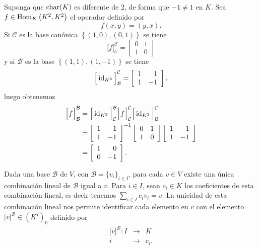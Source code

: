 \begin{ejem}
Suponga que $\operatorname{char}(K)$ es diferente de $2$, de forma que $-1\ne 1$ en $K$. Sea $f\in\operatorname{Hom}_K\left(K^2,K^2\right)$ el operador definido por
$$f(x,y)=(y,x).$$
Si $\mathcal{C}$ es la base  can\'onica $\left\{(1,0),(0,1)\right\}$ se tiene
$$\Big[ f\Big]^{\mathcal{C}}_{\mathcal{C}}=
\left[\begin{array}{rr}
0 & 1\\ 1 & 0
\end{array}\right]
$$
y si $\mathcal{B}$ es la base $\left\{(1,1),(1,-1)\right\}$ se tiene
$$\Big[ \operatorname{id}_{K^2}\Big]^{\mathcal{C}}_{\mathcal{B}}=
\left[\begin{array}{rr}
1 & 1\\ 1 & -1
\end{array}\right],
$$
luego obtenemos
\begin{align*}
\Big[ f\Big]^{\mathcal{B}}_{\mathcal{B}} &= \Big[ \operatorname{id}_{K^2}\Big]^{\mathcal{B}}_{\mathcal{C}}\Big[ f\Big]^{\mathcal{C}}_{\mathcal{C}}\Big[ \operatorname{id}_{K^2}\Big]^{\mathcal{C}}_{\mathcal{B}}\\
 &=\left[\begin{array}{rr}
1 & 1\\ 1 & -1
\end{array}\right]^{-1}
\left[\begin{array}{rr}
0 & 1\\ 1 & 0
\end{array}\right]
\left[\begin{array}{rr}
1 & 1\\ 1 & -1
\end{array}\right]\\
 &= \left[\begin{array}{rr}
1 & 0\\ 0 & -1
\end{array}\right].
\end{align*}
\end{ejem}

\begin{obs}\label{defnvectcoorinfty}
Dada una base $\mathcal{B}$ de $V$, con $\mathcal{B}=\{v_i\}_{i\in I}$, para cada $v\in V$ existe una \'unica combinaci\'on lineal de $\mathcal{B}$ igual a $v$. Para $i\in I$, sean $c_i\in K$ los coeficientes de esta combinaci\'on lineal, es decir tenemos $\sum_{i\in I} c_iv_i=v$.
La unicidad de esta combinaci\'on lineal nos permite identificar cada elemento en $v$ con el elemento $\Big[v\Big]^\mathcal{B}\in\left(K^I\right)_0$ definido por
\begin{eqnarray*}
\Big[v\Big]^\mathcal{B}: I & \longrightarrow & K\\
i & \longrightarrow & c_i.
\end{eqnarray*}
\end{obs}

